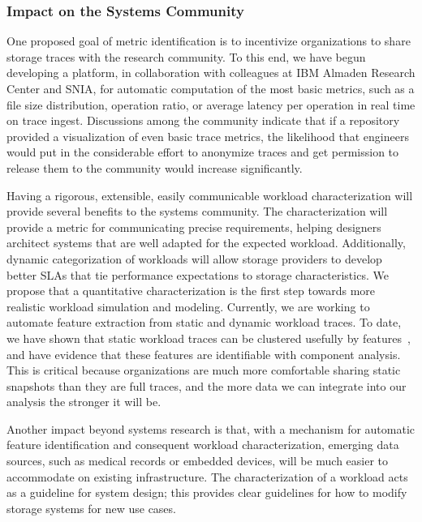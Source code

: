 \subsubsection*{Impact on the Systems Community}

One proposed goal of metric identification is to incentivize organizations to
share storage traces with the research community.  To this end, we have begun
developing a platform, in collaboration with colleagues at IBM Almaden Research
Center and SNIA, for automatic computation of the most basic metrics, such
as a file size distribution, operation ratio, or average latency per operation
in real time on trace ingest.  Discussions among the community indicate that if
a repository provided a visualization of even basic trace metrics, the
likelihood that engineers would put in the considerable effort to anonymize
traces and get permission to release them to the community would increase
significantly.  

Having a rigorous, extensible, easily communicable workload characterization
will provide several benefits to the systems community.  The characterization
will provide a metric for communicating precise requirements, helping designers
architect systems that are well adapted for the expected workload.
Additionally, dynamic categorization of workloads will allow storage providers to
develop better SLAs that tie performance expectations to storage
characteristics.  We propose that a quantitative characterization is
the first step towards more realistic workload simulation and modeling.
Currently, we are working to automate feature extraction from static and dynamic
workload traces. To date, we have shown that static workload traces can be
clustered usefully by features~\cite{static}, and have evidence that these
features are identifiable with component analysis.  This is critical because
organizations are much more comfortable sharing static snapshots than they are
full traces, and the more data we can integrate into our analysis the stronger
it will be.  

Another impact beyond systems research is that, with a mechanism for automatic
feature identification and consequent workload characterization, emerging data
sources, such as medical records or embedded devices, will be much easier to
accommodate on existing infrastructure.  The characterization of a workload acts
as a guideline for system design; this provides clear guidelines for how to
modify storage systems for new use cases.

